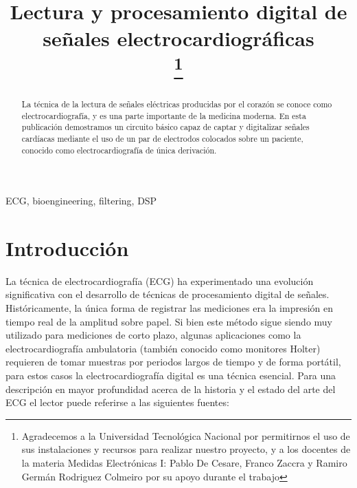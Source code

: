 \documentclass[conference]{IEEEtran}
\begin{document}
 
 
\title{Lectura y procesamiento digital de señales electrocardiográficas\\
\thanks{Agradecemos a la Universidad Tecnológica Nacional por permitirnos
el uso de sus instalaciones y recursos para realizar nuestro proyecto, y a los
docentes de la materia Medidas Electrónicas I: Pablo De Cesare, Franco Zaccra
y Ramiro Germán Rodriguez Colmeiro por su apoyo durante el trabajo}
}

\author{
\and
{}
}
 
\maketitle

\begin{abstract}
La técnica de la lectura de señales eléctricas producidas por el corazón se conoce
como electrocardiografía, y es una parte importante de la medicina moderna. En esta
publicación demostramos un circuito básico capaz de captar y digitalizar señales
cardíacas mediante el uso de un par de electrodos colocados sobre un paciente,
conocido como electrocardiografía de única derivación. 
\end{abstract}

\begin{IEEEkeywords}
ECG, bioengineering, filtering, DSP
\end{IEEEkeywords}

\section{Introducción}
 
La técnica de electrocardiografía (ECG) ha experimentado una evolución significativa
con el desarrollo de técnicas de procesamiento digital de señales. Históricamente,
la única forma de registrar las mediciones era la impresión en tiempo real de la amplitud
sobre papel. Si bien este método sigue siendo muy utilizado para mediciones de corto
plazo, algunas aplicaciones como la electrocardiografía ambulatoria (también conocido como
monitores Holter) requieren de tomar muestras por periodos largos de tiempo y de forma portátil, para estos casos la electrocardiografía digital es una técnica esencial. Para una descripción en mayor profundidad acerca de la historia y el estado del arte del ECG  el lector puede referirse a las siguientes fuentes: \cite{ecg_history} \cite{ecg_moderno}
  
\end{document}
